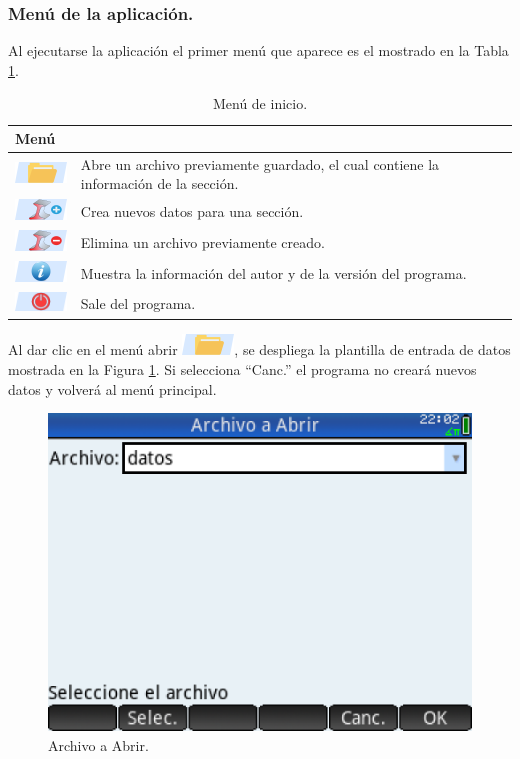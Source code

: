 \documentclass[spanish,xcolor=pdftex,dvipsnames,table,mathserif]{scrartcl}
\begin{document}
\subsubsection{Menú de la aplicación.}
Al ejecutarse la aplicación el primer menú que aparece es el mostrado en la Tabla \ref{tab:menuInicio}. 
\begin{table}[H]
	\caption{Menú de inicio.}
	\label{tab:menuInicio}
	\begin{tabular}{>{\centering}m{2cm}>{\raggedright}m{14cm}}
		\toprule 
		\textbf{Menú} & \multicolumn{1}{c}{\textbf{Descripción}} \tabularnewline
		\midrule 
		\includegraphics{imagenes/men_abrir}
		& Abre un archivo previamente guardado, el cual contiene la información de la sección. \tabularnewline
		\cmidrule(lr){1-2}
		\includegraphics{imagenes/men_nuevo} & Crea nuevos datos para una sección.\tabularnewline
		\cmidrule(lr){1-2}
		\includegraphics{imagenes/men_eliminar}& Elimina un archivo previamente creado.\tabularnewline
		\cmidrule(lr){1-2}
		\includegraphics{imagenes/men_about}& Muestra la información del autor y de la versión del programa.\tabularnewline
		\cmidrule(lr){1-2}
		\includegraphics{imagenes/men_salir}& Sale del programa.\tabularnewline
		\bottomrule
	\end{tabular}
\end{table}
Al dar clic en el menú abrir \includegraphics{imagenes/men_abrir}, se despliega la plantilla de entrada de datos mostrada en la Figura \ref{fig:archivoabrir}. Si selecciona ``Canc.''  el programa no creará nuevos datos y volverá al menú principal.
\begin{figure}[H]
	\centering
	\caption[Archivo a Abrir.]{Archivo a Abrir.}
	\label{fig:archivoabrir}
	\includegraphics[width=0.45\linewidth]{imagenes/archivoAbrir}
\end{figure}
\end{document}
